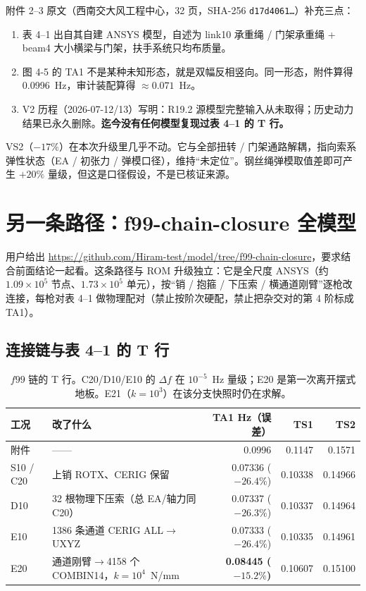 \documentclass[11pt,a4paper]{ctexart}
\begin{document}
附件 2--3 原文（西南交大风工程中心，32 页，SHA-256 \texttt{d17d4061\ldots}）补充三点：
\begin{enumerate}
  \item 表 4--1 出自其自建 ANSYS 模型，自述为 link10 承重绳 / 门架承重绳 + beam4 大小横梁与门架，扶手系统只均布质量。
  \item 图 4-5 的 TA1 不是某种未知形态，就是双幅反相竖向。同一形态，附件算得 0.0996~Hz，审计装配算得 $\approx0.071$~Hz。
  \item V2 历程（2026-07-12/13）写明：R19.2 源模型完整输入从未取得；历史动力结果已永久删除。\textbf{迄今没有任何模型复现过表 4--1 的 T 行。}
\end{enumerate}

VS2（$-17\%$）在本次升级里几乎不动。它与全部扭转 / 门架通路解耦，指向索系弹性状态（EA / 初张力 / 弹模口径），维持``未定位''。钢丝绳弹模取值差即可产生 $+20\%$ 量级，但这是口径假设，不是已核证来源。

\section{另一条路径：f99-chain-closure 全模型}

用户给出 \url{https://github.com/Hiram-test/model/tree/f99-chain-closure}，要求结合前面结论一起看。这条路径与 ROM 升级独立：它是全尺度 ANSYS（约 $1.09\times10^{5}$ 节点、$1.73\times10^{5}$ 单元），按``销 / 抱箍 / 下压索 / 横通道刚臂''逐枪改连接，每枪对表 4--1 做物理配对（禁止按阶次硬配，禁止把杂交对的第 4 阶标成 TA1）。

\subsection{连接链与表 4--1 的 T 行}

\begin{table}[h]\centering\footnotesize
\begin{tabular}{llrrr}
\toprule
工况 & 改了什么 & TA1 Hz（误差） & TS1 & TS2 \\
\midrule
附件 & —— & 0.0996 & 0.1147 & 0.1571 \\
S10 / C20 & 上销 ROTX、CERIG 保留 & 0.07336 ($-26.4\%$) & 0.10338 & 0.14966 \\
D10 & 32 根物理下压索（总 EA/轴力同 C20） & 0.07337 ($-26.3\%$) & 0.10337 & 0.14964 \\
E10 & 1386 条通道 CERIG ALL$\to$UXYZ & 0.07333 ($-26.4\%$) & 0.10335 & 0.14961 \\
E20 & 通道刚臂$\to$4158 个 COMBIN14，$k=10^{4}$~N/mm & \textbf{0.08445 ($-15.2\%$)} & 0.10607 & 0.15100 \\
\bottomrule
\end{tabular}
\caption{$f99$ 链的 T 行。C20/D10/E10 的 $\Delta f$ 在 $10^{-5}$~Hz 量级；E20 是第一次离开摆式地板。E21（$k=10^{3}$）在该分支快照时仍在求解。}
\end{table}
\end{document}
